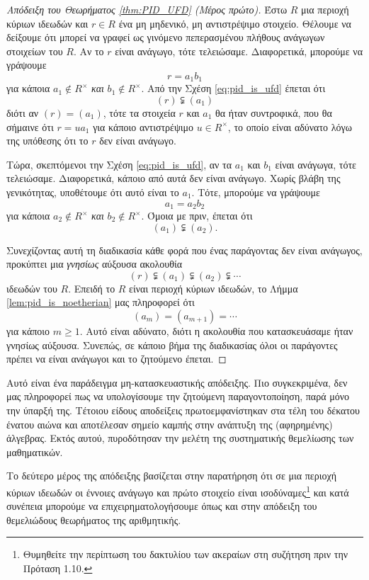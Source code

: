 \documentclass[12pt,a4paper,reqno]{amsart}
\theoremstyle{definition}
\theoremstyle{remark}
\numberwithin{theorem}{section}
\numberwithin{exercise}{section}
\numberwithin{equation}{section}
\begin{document}
\begin{proof}[Απόδειξη του Θεωρήματος \ref{thm:PID_UFD} (Μέρος πρώτο)]
    Έστω $R$ μια περιοχή κύριων ιδεωδών και $r \in R$ ένα μη μηδενικό, μη αντιστρέψιμο στοιχείο. Θέλουμε να δείξουμε ότι μπορεί να γραφεί ως γινόμενο πεπερασμένου πλήθους ανάγωγων στοιχείων του $R$. Αν το $r$ είναι ανάγωγο, τότε τελειώσαμε. Διαφορετικά, μπορούμε να γράψουμε 
    \begin{equation}
        \label{eq:pid_is_ufd}
        r = a_1b_1 
    \end{equation}
    για κάποια $a_1\notin R^\times$ \emph{και} $b_1 \notin R^\times$. Από την Σχέση \eqref{eq:pid_is_ufd} έπεται ότι 
    \[
    (r) \subsetneqq (a_1)
    \]
    διότι αν $(r) = (a_1)$, τότε τα στοιχεία $r$ και $a_1$ θα ήταν συντροφικά, που θα σήμαινε ότι $r = ua_1$ για κάποιο αντιστρέψιμο $u \in R^\times$, το οποίο είναι αδύνατο λόγω της υπόθεσης ότι το $r$ δεν είναι ανάγωγο.

    Tώρα, σκεπτόμενοι την Σχέση \eqref{eq:pid_is_ufd}, αν τα $a_1$ και $b_1$ είναι ανάγωγα, τότε τελειώσαμε. Διαφορετικά, κάποιο από αυτά δεν είναι ανάγωγο. Χωρίς βλάβη της γενικότητας, υποθέτουμε ότι αυτό είναι το $a_1$. Τότε, μπορούμε να γράψουμε 
    \[
    a_1 = a_2b_2
    \]
    για κάποια $a_2\notin R^\times$ \emph{και} $b_2 \notin R^\times$. Όμοια με πριν, έπεται ότι 
    \[
    (a_1) \subsetneqq (a_2).
    \]

    Συνεχίζοντας αυτή τη διαδικασία κάθε φορά που ένας παράγοντας δεν είναι ανάγωγος, προκύπτει μια \emph{γνησίως} αύξουσα ακολουθία 
    \[
    (r) \subsetneqq (a_1) \subsetneqq (a_2) \subsetneqq \cdots
    \]
    ιδεωδών του $R$. Επειδή το $R$ είναι περιοχή κύριων ιδεωδών, το Λήμμα \ref{lem:pid_is_noetherian} μας πληροφορεί ότι 
    \[
    (a_m) = (a_{m+1}) = \cdots 
    \]
    για κάποιο $m \ge 1$. Αυτό είναι αδύνατο, διότι η ακολουθία που κατασκευάσαμε ήταν γνησίως αύξουσα. Συνεπώς, σε κάποιο βήμα της διαδικασίας όλοι οι παράγοντες πρέπει να είναι ανάγωγοι και το ζητούμενο έπεται.
\end{proof}

Αυτό είναι ένα παράδειγμα μη-κατασκευαστικής απόδειξης. Πιο συγκεκριμένα, δεν μας πληροφορεί πως να υπολογίσουμε την ζητούμενη παραγοντοποίηση, παρά μόνο την ύπαρξή της. Τέτοιου είδους αποδείξεις πρωτοεμφανίστηκαν στα τέλη του δέκατου ένατου αιώνα και αποτέλεσαν σημείο καμπής στην ανάπτυξη της (αφηρημένης) άλγεβρας. Εκτός αυτού, πυροδότησαν την μελέτη της συστηματικής θεμελίωσης των μαθηματικών.

Το δεύτερο μέρος της απόδειξης βασίζεται στην παρατήρηση ότι σε μια περιοχή κύριων ιδεωδών οι έννοιες ανάγωγο και πρώτο στοιχείο είναι ισοδύναμες\footnote{Θυμηθείτε την περίπτωση του δακτυλίου των ακεραίων στη συζήτηση πριν την Πρόταση 1.10.} και κατά συνέπεια μπο\-ρούμε να επιχειρηματολογήσουμε όπως και στην απόδειξη του θεμελιώδους θεωρήματος της αριθμητικής. 
\end{document}
